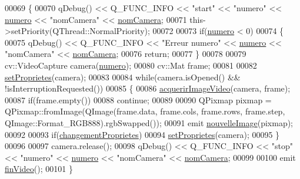 \begin{DoxyCode}
00069 \{
00070     qDebug() << Q\_FUNC\_INFO << \textcolor{stringliteral}{"start"} << \textcolor{stringliteral}{"numero"} << \hyperlink{class_camera_ae5cda5df3c9c49b88fff15389a1bbc64}{numero} << \textcolor{stringliteral}{"nomCamera"} << 
      \hyperlink{class_camera_ac1cdaf82921d2a2f3f941d867718eba2}{nomCamera};
00071     this->setPriority(QThread::NormalPriority);
00072 
00073     \textcolor{keywordflow}{if}(\hyperlink{class_camera_ae5cda5df3c9c49b88fff15389a1bbc64}{numero} < 0)
00074     \{
00075         qDebug() << Q\_FUNC\_INFO  << \textcolor{stringliteral}{"Erreur numero"} << \hyperlink{class_camera_ae5cda5df3c9c49b88fff15389a1bbc64}{numero} << \textcolor{stringliteral}{"nomCamera"} << 
      \hyperlink{class_camera_ac1cdaf82921d2a2f3f941d867718eba2}{nomCamera};
00076         \textcolor{keywordflow}{return};
00077     \}
00078 
00079     cv::VideoCapture camera(\hyperlink{class_camera_ae5cda5df3c9c49b88fff15389a1bbc64}{numero});
00080     cv::Mat frame;
00081 
00082     \hyperlink{class_camera_a77397d68d606172ccfafed5624c31213}{setProprietes}(camera);
00083 
00084     \textcolor{keywordflow}{while}(camera.isOpened() && !isInterruptionRequested())
00085     \{
00086         \hyperlink{class_camera_afbddcda62053404cbf06a4ba48c62732}{acquerirImageVideo}(camera, frame);
00087         \textcolor{keywordflow}{if}(frame.empty())
00088             \textcolor{keywordflow}{continue};
00089 
00090         QPixmap pixmap = QPixmap::fromImage(QImage(frame.data, frame.cols, frame.rows, frame.step, 
      QImage::Format\_RGB888).rgbSwapped());
00091         emit \hyperlink{class_camera_a38c810d466375e950401e483f885c52f}{nouvelleImage}(pixmap);
00092 
00093         \textcolor{keywordflow}{if}(\hyperlink{class_camera_a50d2b3ef5c08f8b61bbe2115d71005bd}{changementProprietes})
00094             \hyperlink{class_camera_a77397d68d606172ccfafed5624c31213}{setProprietes}(camera);
00095     \}
00096 
00097     camera.release();
00098     qDebug() << Q\_FUNC\_INFO << \textcolor{stringliteral}{"stop"} << \textcolor{stringliteral}{"numero"} << \hyperlink{class_camera_ae5cda5df3c9c49b88fff15389a1bbc64}{numero} << \textcolor{stringliteral}{"nomCamera"} << 
      \hyperlink{class_camera_ac1cdaf82921d2a2f3f941d867718eba2}{nomCamera};
00099 
00100     emit \hyperlink{class_camera_a4c560c4add60ebce65e2d9717e3d668c}{finVideo}();
00101 \}
\end{DoxyCode}
\mbox{\label{class_camera_acc596f589be1e2e2d8e46e071ce38036}} 

